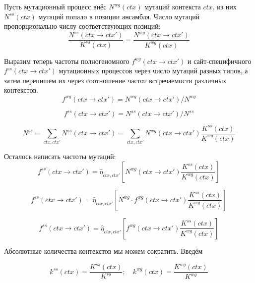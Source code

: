 \documentclass[a4paper]{article}
\begin{document}
Пусть мутационный процесс внёс $N^{wg}(ctx)$ мутаций контекста $ctx$, из них $N^{ss}(ctx)$ мутаций попало в позиции ансамбля. Число мутаций пропорционально числу соответствующих позиций:
\begin{equation}
\frac{N^{ss}(ctx \to ctx')}{K^{ss}(ctx)} = \frac{N^{wg}(ctx \to ctx')}{K^{wg}(ctx)}
\end{equation}


Выразим теперь частоты полногеномного $f^{wg}(ctx\to ctx')$ и сайт-специфичного $f^{ss}(ctx\to ctx')$ мутационных процессов через число мутаций разных типов, а затем перепишем их через соотношение частот встречаемости различных контекстов.
\begin{equation}
f^{wg}(ctx \to ctx') = N^{wg}(ctx \to ctx') / N^{wg}
\end{equation}

\begin{equation}
f^{ss}(ctx \to ctx') = N^{ss}(ctx \to ctx') / N^{ss}
\end{equation}

\begin{equation}
N^{ss} = \sum_{ctx, ctx'} N^{ss}(ctx \to ctx') = \sum_{ctx, ctx'} N^{wg}(ctx \to ctx') \frac{K^{ss}(ctx)}{K^{wg}(ctx)}
\end{equation}

Осталось написать частоты мутаций:
\begin{equation}
	f^{ss}(ctx \to ctx') = \widehat{\eta}_{ctx,ctx'}\left[ N^{wg}(ctx \to ctx') \frac{K^{ss}(ctx)}{K^{wg}(ctx)} \right]
\end{equation}

\begin{equation}
	f^{ss}(ctx \to ctx') = \widehat{\eta}_{ctx,ctx'}\left[ N^{wg}\cdot f^{wg}(ctx \to ctx') \frac{K^{ss}(ctx)}{K^{wg}(ctx)} \right]
\end{equation}

\begin{equation}
	f^{ss}(ctx \to ctx') = \widehat{\eta}_{ctx,ctx'}\left[ f^{wg}(ctx \to ctx') \frac{K^{ss}(ctx)}{K^{wg}(ctx)} \right]
\end{equation}

Абсолютные количества контекстов мы можем сократить. Введём

\begin{equation}
	k^{ss}(ctx) = \frac{K^{ss}(ctx)}{K^{ss}};\quad k^{wg}(ctx) = \frac{K^{wg}(ctx)}{K^{wg}}
\end{equation}
\end{document}
